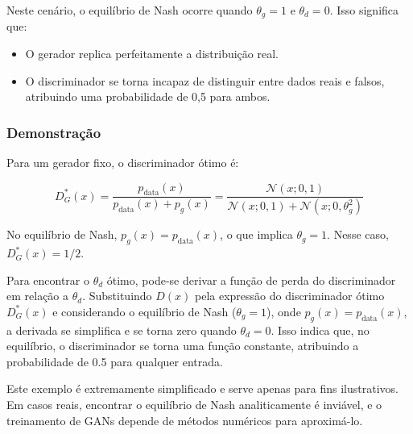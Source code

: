 \documentclass{article}
\begin{document}
Neste cenário, o equilíbrio de Nash ocorre quando $\theta_g = 1$ e $\theta_d = 0$. Isso significa que:
\begin{itemize}
    \item O gerador replica perfeitamente a distribuição real.
    \item O discriminador se torna incapaz de distinguir entre dados reais e falsos, atribuindo uma probabilidade de 0,5 para ambos.
\end{itemize}

\subsubsection{Demonstração}

Para um gerador fixo, o discriminador ótimo é:

\begin{equation}
D^*_G(x) = \frac{p_{\text{data}}(x)}{p_{\text{data}}(x) + p_g(x)} = \frac{\mathcal{N}(x; 0, 1)}{\mathcal{N}(x; 0, 1) + \mathcal{N}(x; 0, \theta_g^2)}
\end{equation}

No equilíbrio de Nash, $p_g(x) = p_{\text{data}}(x)$, o que implica $\theta_g = 1$. Nesse caso, $D^*_G(x) = 1/2$.

Para encontrar o $\theta_d$ ótimo, pode-se derivar a função de perda do discriminador em relação a $\theta_d$. Substituindo $D(x)$ pela expressão do discriminador ótimo $D^*_G(x)$ e considerando o equilíbrio de Nash ($\theta_g = 1$), onde $p_g(x) = p_{\text{data}}(x)$, a derivada se simplifica e se torna zero quando $\theta_d = 0$. Isso indica que, no equilíbrio, o discriminador se torna uma função constante, atribuindo a probabilidade de 0.5 para qualquer entrada.


Este exemplo é extremamente simplificado e serve apenas para fins ilustrativos. Em casos reais, encontrar o equilíbrio de Nash analiticamente é inviável, e o treinamento de GANs depende de métodos numéricos para aproximá-lo.
\end{document}
